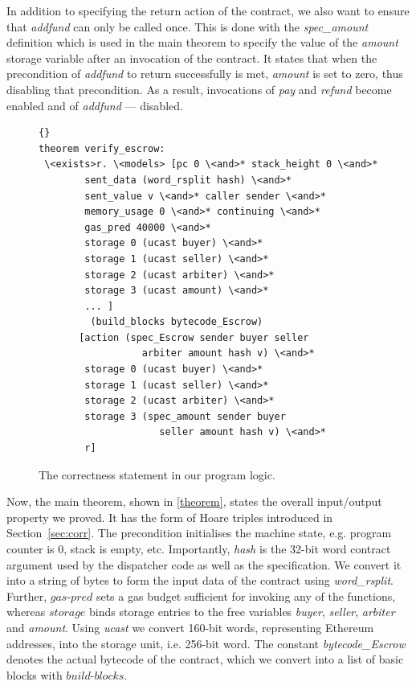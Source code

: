 \documentclass[sigplan,10pt]{acmart}\settopmatter{printfolios=true,printccs=false,printacmref=false}
\newcommand{\gaspred}{\mathit{gas\mbox{-}pred}}
\newcommand{\storage}{\mathit{storage}}
\newcommand{\bblocks}{\mathit{build\mbox{-}blocks}}
\begin{document}
In addition to specifying the return action of the contract, we also want
to ensure that \textit{addfund} can only be called once.
This is done with the \textit{spec\_amount} definition which
is used in the main theorem to specify the value of the
\textit{amount} storage variable after an invocation of the contract.
It states that when the precondition of \textit{addfund} to
return successfully is met, \textit{amount} is set to zero,
thus disabling that precondition.
As a result, invocations of \textit{pay} and \textit{refund} become enabled
and of \textit{addfund} --- disabled.

\begin{figure}[h]
\begin{lstlisting}[language=Isar,keywords={[3]{hash,sender,buyer,seller,arbiter,amount,v}}]{}
theorem verify_escrow:
 \<exists>r. \<models> [pc 0 \<and>* stack_height 0 \<and>*
        sent_data (word_rsplit hash) \<and>*
        sent_value v \<and>* caller sender \<and>*
        memory_usage 0 \<and>* continuing \<and>*
        gas_pred 40000 \<and>*
        storage 0 (ucast buyer) \<and>*
        storage 1 (ucast seller) \<and>*
        storage 2 (ucast arbiter) \<and>*
        storage 3 (ucast amount) \<and>*
        ... ]
         (build_blocks bytecode_Escrow)
       [action (spec_Escrow sender buyer seller
                  arbiter amount hash v) \<and>*
        storage 0 (ucast buyer) \<and>*
        storage 1 (ucast seller) \<and>*
        storage 2 (ucast arbiter) \<and>*
        storage 3 (spec_amount sender buyer
                     seller amount hash v) \<and>*
        r]
\end{lstlisting}
\caption{The correctness statement in our program logic.}  
\label{theorem}
\end{figure}
Now, the main theorem, shown in \autoref{theorem}, states the overall input/output 
property we proved.
It has the form of Hoare triples introduced in Section~\ref{sec:corr}.
The precondition initialises the machine state, e.g. program counter is $0$,
stack is empty, etc.
Importantly, \textit{hash} is the 32-bit word contract
argument used by the dispatcher code as well as the specification.
We convert it into a string of bytes to form the input data of the contract
using \textit{word\_rsplit}.
Further, $\gaspred$ sets a gas budget sufficient for invoking any
of the functions, whereas $\storage$
binds storage entries to the free variables \textit{buyer}, \textit{seller},
\textit{arbiter} and \textit{amount}. %
Using \textit{ucast} we convert 160-bit words, representing Ethereum
addresses, into the storage unit, i.e. 256-bit word.
The constant \textit{bytecode\_Escrow} denotes
the actual bytecode of the contract,
which we convert into a list of basic blocks with $\bblocks$.
\end{document}

